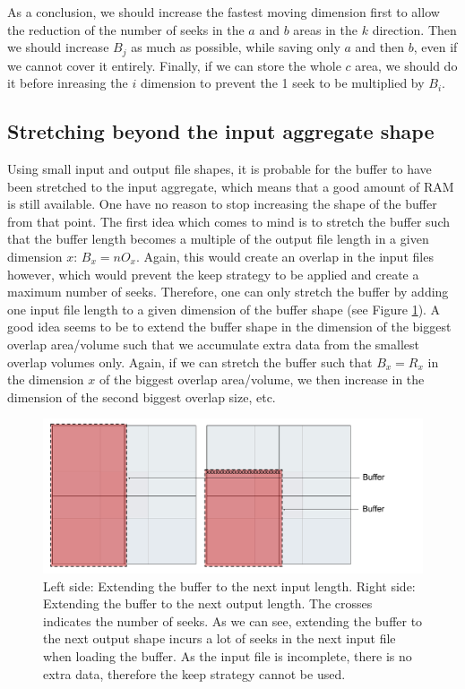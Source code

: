 \documentclass[conference]{IEEEtran}
\begin{document}
As a conclusion, we should increase the fastest moving dimension first to allow the reduction of the number of seeks in the $a$ and $b$ areas in the $k$ direction.
Then we should increase $B_j$ as much as possible, while saving only $a$ and then $b$, even if we cannot cover it entirely.
Finally, if we can store the whole $c$ area, we should do it before inreasing the $i$ dimension to prevent the 1 seek to be multiplied by $B_i$. \\

\subsection{Stretching beyond the input aggregate shape}
Using small input and output file shapes, it is probable for the buffer to have been stretched to the input aggregate, which means that a good amount of RAM is still available.
One have no reason to stop increasing the shape of the buffer from that point.
The first idea which comes to mind is to stretch the buffer such that the buffer length becomes a multiple of the output file length in a given dimension $x$: $B_x = nO_x$.
Again, this would create an overlap in the input files however, which would prevent the keep strategy to be applied and create a maximum number of seeks.
Therefore, one can only stretch the buffer by adding one input file length to a given dimension of the buffer shape (see Figure \ref{fig:extendingbuffers}).
A good idea seems to be to extend the buffer shape in the dimension of the biggest overlap area/volume such that we accumulate extra data from the smallest overlap volumes only.
Again, if we can stretch the buffer such that $B_x = R_x$ in the dimension $x$ of the biggest overlap area/volume, we then increase in the dimension of the second biggest overlap size, etc.

\begin{figure}[h]
\centering
\includegraphics[scale=0.20]{./figures/extendingbuffers.png}
\caption{ Left side: Extending the buffer to the next input length. Right side: Extending the buffer to the next output length. The crosses indicates the number of seeks. As we can see, extending the buffer to the next output shape incurs a lot of seeks in the next input file when loading the buffer. As the input file is incomplete, there is no extra data, therefore the keep strategy cannot be used.
}
\label{fig:extendingbuffers}
\end{figure}
\end{document}
